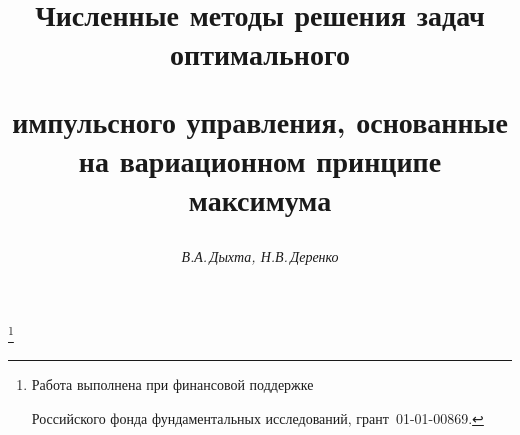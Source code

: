 




%





\newcommand{\mes}{\operatorname{mes}}


\newcommand{\vraisup}{\operatorname{vrai\;sup}}


\newcommand{\tts}[1]{}







\setcounter{page}{32}















\author{\it В.А.\,Дыхта, Н.В.\,Деренко}




\title{Численные методы решения задач оптимального


импульсного управления, основанные на вариационном принципе максимума}


\thanks{Работа выполнена при финансовой поддержке


Российского фонда фундаментальных исследований, грант \No\,01-01-00869.}





\date{}




\pagestyle{plain} %







